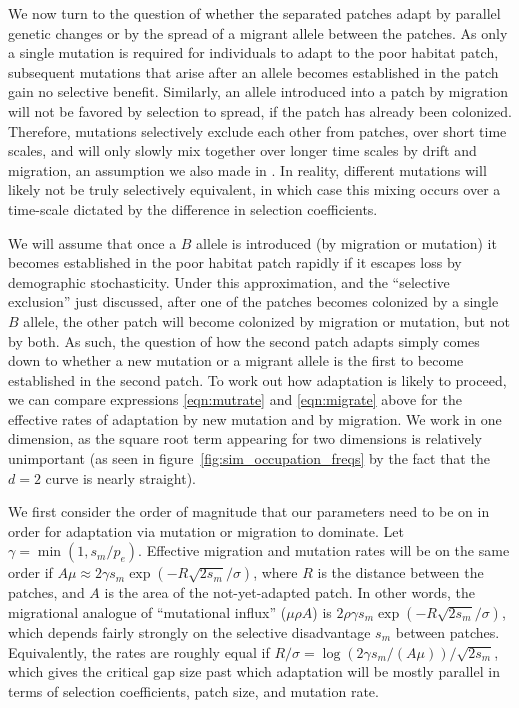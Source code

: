 \documentclass{article}
\newcommand{\linelabel}[1]{}
\newcommand{\citep}[1]{\cite{#1}}
\begin{document}
We now turn to the question of whether the separated patches adapt by parallel genetic changes 
or by the spread of a migrant allele between the patches.
As only a single mutation is required for individuals to adapt to the
poor habitat patch, subsequent mutations that arise after an allele becomes established in the patch gain no selective benefit. 
Similarly, an allele introduced into a patch by migration will not be favored by selection to spread, 
if the patch has already been colonized. 
Therefore, mutations selectively exclude each other from patches, over short time scales, 
and will only slowly mix together over longer time scales by drift and migration,
an assumption we also made in \citep{ralph2010parallel}. 
In reality, different mutations will likely not be truly selectively equivalent,
in which case this mixing occurs over a time-scale dictated by the difference in selection coefficients.

We will assume that once a $B$ allele is introduced (by migration or mutation) 
it becomes established in the poor habitat patch rapidly
if it escapes loss by demographic stochasticity.
Under this approximation, and the ``selective exclusion'' just discussed,
after one of the patches becomes colonized by a single $B$ allele, 
the other patch will become colonized by migration or mutation, but not by both. 
As such, the question of how the second patch adapts
simply comes down to whether a new mutation or a migrant allele is the first to become established in the second patch. 
To work out how adaptation is likely to proceed, 
we can compare expressions \eqref{eqn:mutrate} and \eqref{eqn:migrate} above
for the effective rates of adaptation by new mutation and by migration.
We work in one dimension, as the square root term appearing for two dimensions is relatively unimportant 
(as seen in figure~\ref{fig:sim_occupation_freqs} by the fact that the $d=2$ curve is nearly straight).
\linelabel{rr:sqrt_term}

We first consider the order of magnitude that our parameters need to
be on in order for adaptation via mutation or migration to dominate.
Let $\gamma = \min(1,s_m/p_e)$.
Effective migration and mutation rates will be on the same order if 
$A \mu \approx 2 \gamma s_m \exp(- R \sqrt{2 s_m} / \sigma)$,
where $R$ is the distance between the patches,
and $A$ is the area of the not-yet-adapted patch.
In other words, the migrational analogue of ``mutational influx'' ($\mu \rho A$) 
is $2 \rho \gamma s_m \exp(- R \sqrt{2 s_m} / \sigma)$,
which depends fairly strongly on the selective disadvantage $s_m$ between patches.
Equivalently, the rates are roughly equal if
$R/\sigma = \log(2 \gamma s_m/(A \mu))/\sqrt{2s_m}$,
which gives the critical gap size past which adaptation will be mostly parallel
in terms of selection coefficients, patch size, and mutation rate.
\end{document}
